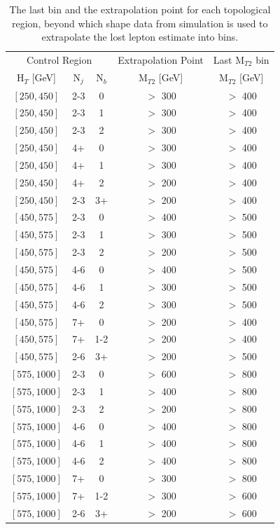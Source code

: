 \begin{table}
	\centering
	\caption{The last \mttwo bin and the \mttwo extrapolation point for each topological region, beyond which shape data from simulation is used to extrapolate the lost lepton estimate into \mttwo bins.}
	\footnotesize
	\renewcommand{\arraystretch}{0.4}
	\begin{tabular}{c|c|c|c|c}
\hline \hline
\multicolumn{3}{c|}{Control Region} & Extrapolation Point & Last $\text{M}_{T2}$ bin  \\
$\text{H}_{T}$ [GeV] & $\text{N}_{j}$ & $\text{N}_{b}$ & $\text{M}_{T2}$ [GeV] & $\text{M}_{T2}$ [GeV]\\
\hline
$[250,450]$ &2-3&0& $>$ 300& $>$ 400\\
$[250,450]$ &2-3&1& $>$ 300& $>$ 400\\
$[250,450]$ &2-3&2& $>$ 300& $>$ 400\\
$[250,450]$ &4+&0& $>$ 300& $>$ 400\\
$[250,450]$ &4+&1& $>$ 300& $>$ 400\\
$[250,450]$ &4+&2& $>$ 200& $>$ 400\\
$[250,450]$ &2-3&3+& $>$ 200& $>$ 400\\
$[450,575]$ &2-3&0& $>$ 400& $>$ 500\\
$[450,575]$ &2-3&1& $>$ 300& $>$ 500\\
$[450,575]$ &2-3&2& $>$ 200& $>$ 500\\
$[450,575]$ &4-6&0& $>$ 400& $>$ 500\\
$[450,575]$ &4-6&1& $>$ 300& $>$ 500\\
$[450,575]$ &4-6&2& $>$ 300& $>$ 500\\
$[450,575]$ &7+&0& $>$ 200& $>$ 400\\
$[450,575]$ &7+&1-2& $>$ 200& $>$ 400\\
$[450,575]$ &2-6&3+& $>$ 200& $>$ 500\\
$[575,1000]$ &2-3&0& $>$ 600& $>$ 800\\
$[575,1000]$ &2-3&1& $>$ 400& $>$ 800\\
$[575,1000]$ &2-3&2& $>$ 200& $>$ 800\\
$[575,1000]$ &4-6&0& $>$ 400& $>$ 800\\
$[575,1000]$ &4-6&1& $>$ 400& $>$ 800\\
$[575,1000]$ &4-6&2& $>$ 400& $>$ 800\\
$[575,1000]$ &7+&0& $>$ 300& $>$ 800\\
$[575,1000]$ &7+&1-2& $>$ 300& $>$ 600\\
$[575,1000]$ &2-6&3+& $>$ 200& $>$ 600\\

\end{tabular}
\end{table}
